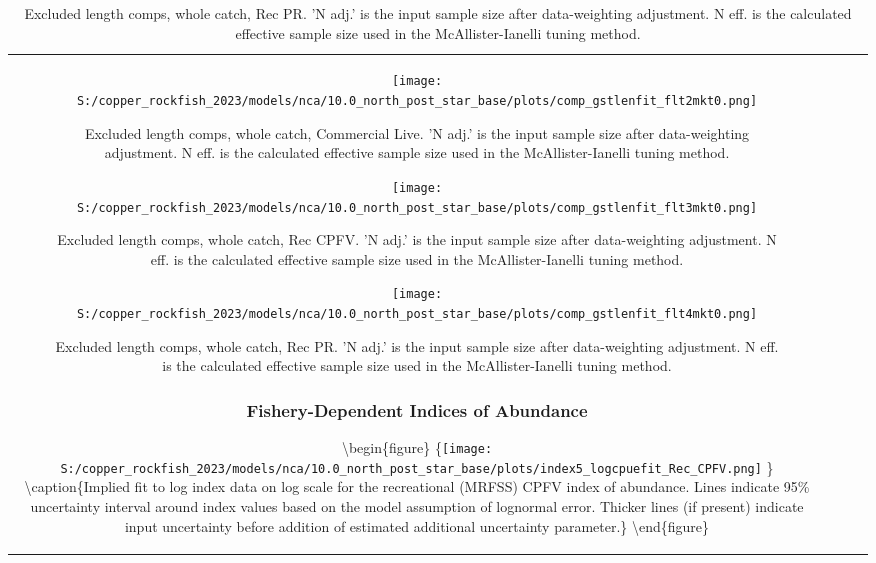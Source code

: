 \documentclass[11pt,
  letterpaper,
]{article}
\begin{document}
\begin{longtable}[t]{c>{\centering\arraybackslash}p{2cm}>{\centering\arraybackslash}p{2cm}>{\centering\arraybackslash}p{2cm}}
\begin{figure}
{\centering
\texttt{[image: S:/copper\_rockfish\_2023/models/nca/10.0\_north\_post\_star\_base/plots/comp\_gstlenfit\_flt2mkt0.png]}
}
\caption{Excluded length comps, whole catch, Commercial Live.  'N adj.' is the input sample size after data-weighting adjustment. N eff. is the calculated effective sample size used in the McAllister-Ianelli tuning method.\label{fig:comp-gstlenfit-flt2mkt0}}
\end{figure}

\begin{figure}
{\centering
\texttt{[image: S:/copper\_rockfish\_2023/models/nca/10.0\_north\_post\_star\_base/plots/comp\_gstlenfit\_flt3mkt0.png]}
}
\caption{Excluded length comps, whole catch, Rec CPFV.  'N adj.' is the input sample size after data-weighting adjustment. N eff. is the calculated effective sample size used in the McAllister-Ianelli tuning method.\label{fig:comp-gstlenfit-flt3mkt0}}
\end{figure}

\begin{figure}
{\centering
\texttt{[image: S:/copper\_rockfish\_2023/models/nca/10.0\_north\_post\_star\_base/plots/comp\_gstlenfit\_flt4mkt0.png]}
}
\caption{Excluded length comps, whole catch, Rec PR.  'N adj.' is the input sample size after data-weighting adjustment. N eff. is the calculated effective sample size used in the McAllister-Ianelli tuning method.\label{fig:comp-gstlenfit-flt4mkt0}}
\end{figure}

\newpage

\subsubsection{Fishery-Dependent Indices of Abundance}\label{fishery-dependent-indices-of-abundance}

\textbackslash begin\{figure\} \{\centering \texttt{[image: S:/copper\_rockfish\_2023/models/nca/10.0\_north\_post\_star\_base/plots/index5\_logcpuefit\_Rec\_CPFV.png]} \} \textbackslash caption\{Implied fit to log index data on log scale for the recreational (MRFSS) CPFV index of abundance. Lines indicate 95\% uncertainty interval around index values based on the model assumption of lognormal error. Thicker lines (if present) indicate input uncertainty before addition of estimated additional uncertainty parameter.\label{fig:mrfss-cpfv-index-fit}\} \textbackslash end\{figure\}


\end{longtable}
\end{document}
